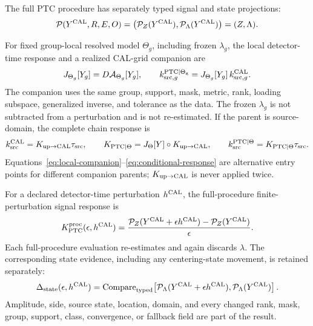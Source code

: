 The full PTC procedure has separately typed signal and state projections:
\begin{equation}
\mathcal P(Y^{\rm CAL},R,E,O)
=\bigl(\mathcal P_Z(Y^{\rm CAL}),\mathcal P_{\Lambda}(Y^{\rm CAL})\bigr)
=(Z,\Lambda).
\label{eq:full-procedure}
\end{equation}

For fixed group-local resolved model $\Theta_g$, including frozen $\lambda_g$,
the local detector-time response and a realized CAL-grid companion are
\begin{equation}
J_{\Theta_g}[Y_g]=D\mathcal A_{\Theta_g}[Y_g],
\qquad
k_{{\rm src},g}^{\rm PTC\mid\Theta_g}
=J_{\Theta_g}[Y_g]\,k_{{\rm src},g}^{\rm CAL}.
\label{eq:local-companion}
\end{equation}
The companion uses the same group, support, mask, metric, rank, loading
subspace, generalized inverse, and tolerance as the data. The frozen
$\lambda_g$ is not subtracted from a perturbation and is not re-estimated.
If the parent is source-domain, the complete chain response is
\begin{equation}
k_{\rm src}^{\rm CAL}=K_{\rm up\to CAL}\tau_{\rm src},
\qquad
K_{\rm PTC\mid\Theta}=J_{\Theta}[Y]\circ K_{\rm up\to CAL},
\qquad
k_{\rm src}^{\rm PTC\mid\Theta}
=K_{\rm PTC\mid\Theta}\tau_{\rm src}.
\label{eq:conditional-response}
\end{equation}
Equations~\ref{eq:local-companion}--\ref{eq:conditional-response} are
alternative entry points for different companion parents;
$K_{\rm up\to CAL}$ is
never applied twice.

For a declared detector-time perturbation $h^{\rm CAL}$, the full-procedure
finite-perturbation signal response is
\begin{equation}
K_{\rm PTC}^{\rm proc}(\epsilon,h^{\rm CAL})=
\frac{\mathcal P_Z(Y^{\rm CAL}+\epsilon h^{\rm CAL})
      -\mathcal P_Z(Y^{\rm CAL})}{\epsilon}.
\label{eq:e2e-response}
\end{equation}
Each full-procedure evaluation re-estimates and again discards $\lambda$. The
corresponding state evidence, including any centering-state movement, is
retained separately:
\begin{equation}
\Delta_{\rm state}(\epsilon,h^{\rm CAL})=
\operatorname{Compare}_{\rm typed}\!\left[
\mathcal P_{\Lambda}(Y^{\rm CAL}+\epsilon h^{\rm CAL}),
\mathcal P_{\Lambda}(Y^{\rm CAL})\right].
\label{eq:e2e-state}
\end{equation}
Amplitude, side, source state, location, domain, and every changed rank, mask,
group, support, class, convergence, or fallback field are part of the result.

